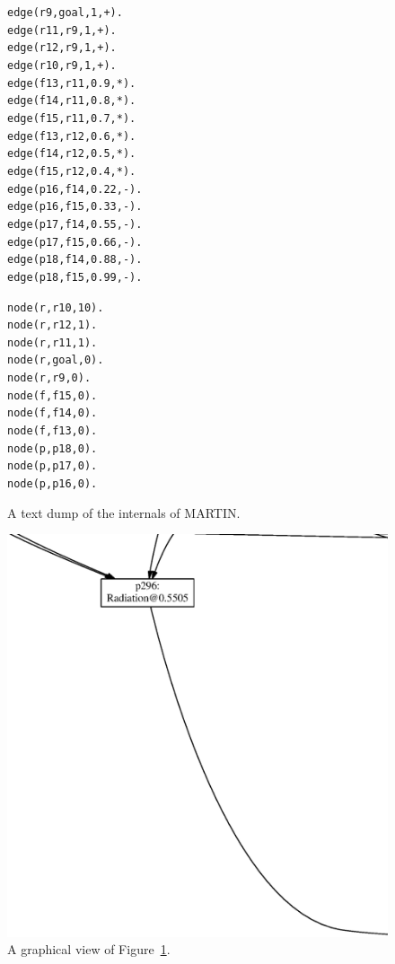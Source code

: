 \documentclass[10pt]{article}
\newcommand{\fig}[1]{Figure~\ref{fig:#1}}
\begin{document}
\begin{figure}
\begin{center}
\begin{minipage}{.45\linewidth}
{\small
\begin{alltt}
edge(r9, goal, 1, +).
edge(r11, r9, 1, +).
edge(r12, r9, 1, +).
edge(r10, r9, 1, +).
edge(f13, r11, 0.9, *).
edge(f14, r11, 0.8, *).
edge(f15, r11, 0.7, *).
edge(f13, r12, 0.6, *).
edge(f14, r12, 0.5, *).
edge(f15, r12, 0.4, *).
edge(p16, f14, 0.22, -).
edge(p16, f15, 0.33, -).
edge(p17, f14, 0.55, -).
edge(p17, f15, 0.66, -).
edge(p18, f14, 0.88, -).
edge(p18, f15, 0.99, -).
\end{alltt}}
\end{minipage}\hfill\begin{minipage}{.45\linewidth}
{\small
\begin{alltt}
node(r, r10, 10).
node(r, r12, 1).
node(r, r11, 1).
node(r, goal, 0).
node(r, r9, 0).
node(f, f15, 0).
node(f, f14, 0).
node(f, f13, 0).
node(p, p18, 0).
node(p, p17, 0).
node(p, p16, 0).
\end{alltt}}
\end{minipage}
\end{center}
\caption{A text dump of the internals of MARTIN.}\label{fig:text}
\end{figure}

\begin{figure}
\begin{center}
\includegraphics[width=5.5in]{report.eps}
\end{center}
\caption{A graphical view of \fig{text}.}\label{fig:one}
\end{figure}
\end{document}
